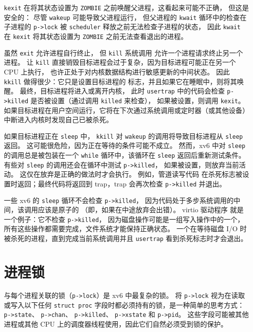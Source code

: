 \lstinline{kexit} 在将其状态设置为 \lstinline{ZOMBIE} 之前唤醒父进程，这看起来可能不正确，
但这是安全的：
尽管
\lstinline{wakeup}
可能导致父进程运行，
但父进程的
\lstinline{kwait}
循环中的检查在子进程的 \lstinline{p->lock}
被 {\tt scheduler} 释放之前无法检查子进程的状态，
因此
\lstinline{kwait}
在
\lstinline{kexit}
将其状态设置为
\lstinline{ZOMBIE}
之前无法查看退出的进程。

虽然
\lstinline{exit}
允许进程自行终止，
但 \lstinline{kill} 系统调用
允许一个进程请求终止另一个进程。
让
\lstinline{kill}
直接销毁目标进程会过于复杂，因为目标进程可能正在另一个 CPU 上执行，
也许正处于对内核数据结构进行敏感更新的中间状态。
因此
\lstinline{kkill}
做得很少：它只是设置目标进程的
标志，并且如果它在睡眠中，则将其唤醒。
最终，目标进程将进入或离开内核，
此时 \lstinline{usertrap} 中的代码会检查
\lstinline{p->killed}
是否被设置（通过调用
\lstinline{killed}
 来检查），
如果被设置，则调用 \lstinline{kexit}。
如果目标进程在用户空间运行，它将在下次通过系统调用或定时器（或其他设备）中断进入内核时发现自己已被杀死。

如果目标进程正在
\lstinline{sleep}
中，
\lstinline{kkill}
对
\lstinline{wakeup}
的调用将导致目标进程从
\lstinline{sleep}
返回。
这可能很危险，因为正在等待的条件可能不成立。
然而，xv6 中对
\lstinline{sleep}
的调用总是被包装在一个
\lstinline{while}
循环中，该循环在
\lstinline{sleep}
返回后重新测试条件。
有些对
\lstinline{sleep}
的调用还会在循环中测试
\lstinline{p->killed}，
如果被设置，则放弃当前活动。
这仅在放弃是正确的做法时才会执行。
例如，管道读写代码
在杀死标志被设置时返回；最终代码将返回到 trap，trap 会再次检查 \lstinline{p->killed} 并退出。

一些 xv6 的
\lstinline{sleep}
循环不会检查
\lstinline{p->killed}，
因为代码处于多步系统调用的中间，该调用应该是原子的
（即，如果在中途放弃会出错）。
virtio 驱动程序
就是一个例子：它不检查
\lstinline{p->killed}，
因为磁盘操作可能是一组写入操作中的一个，所有这些操作都需要完成，文件系统才能保持正确状态。
一个在等待磁盘 I/O 时被杀死的进程，直到完成当前系统调用并且
\lstinline{usertrap} 看到杀死标志时才会退出。

\section{进程锁}

与每个进程关联的锁（\lstinline{p->lock}）是 xv6 中最复杂的锁。
将 \lstinline{p->lock} 视为在读取或写入以下任何 \lstinline{struct proc} 字段时都必须持有的锁，是一种简单的思考方式：
\lstinline{p->state}、
\lstinline{p->chan}、
\lstinline{p->killed}、
\lstinline{p->xstate} 和
\lstinline{p->pid}。
这些字段可能被其他进程或其他 CPU 上的调度器线程使用，因此它们自然必须受到锁的保护。


